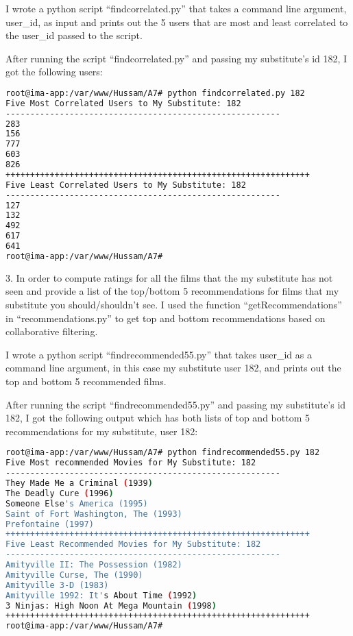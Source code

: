 \documentclass[a4paper, 11pt]{article}
\begin{document}
I wrote a python script ``findcorrelated.py'' that takes a command line argument, user\_id, as input and prints out the 5 users that are most and least correlated to the user\_id passed to the script.



After running the script ``findcorrelated.py'' and passing my substitute's id 182, I got the following users:

\begin{lstlisting}[language=bash, breakatwhitespace=〈false), label=Running findcorrelated.py, caption=Running findcorrelated.py]
root@ima-app:/var/www/Hussam/A7# python findcorrelated.py 182
Five Most Correlated Users to My Substitute: 182
--------------------------------------------------------
283
156
777
603
826
++++++++++++++++++++++++++++++++++++++++++++++++++++++++++++++
Five Least Correlated Users to My Substitute: 182
--------------------------------------------------------
127
132
492
617
641
root@ima-app:/var/www/Hussam/A7#
\end{lstlisting}


3. In order to compute ratings for all the films that the my substitute
has not seen and provide a list of the top/bottom 5 recommendations for films
that my substitute you should/shouldn't see. I used the function ``getRecommendations'' in ``recommendations.py'' to get top and bottom recommendations based on collaborative filtering.
 
I wrote a python script ``findrecommended55.py'' that takes user\_id as a command line argument, in this case my substitute user 182, and prints out the top and bottom 5 recommended films.



After running the script ``findrecommended55.py'' and passing my substitute's id 182, I got the following output which has both lists of top and bottom 5 recommendations for my substitute, user 182:

\begin{lstlisting}[language=bash, breakatwhitespace=〈false), label=Running findrecommended55.py, caption=Running findrecommended55.py]
root@ima-app:/var/www/Hussam/A7# python findrecommended55.py 182
Five Most recommended Movies for My Substitute: 182
--------------------------------------------------------
They Made Me a Criminal (1939)
The Deadly Cure (1996)
Someone Else's America (1995)
Saint of Fort Washington, The (1993)
Prefontaine (1997)
++++++++++++++++++++++++++++++++++++++++++++++++++++++++++++++
Five Least Recommended Movies for My Substitute: 182
--------------------------------------------------------
Amityville II: The Possession (1982)
Amityville Curse, The (1990)
Amityville 3-D (1983)
Amityville 1992: It's About Time (1992)
3 Ninjas: High Noon At Mega Mountain (1998)
++++++++++++++++++++++++++++++++++++++++++++++++++++++++++++++
root@ima-app:/var/www/Hussam/A7#
\end{lstlisting}
\end{document}
